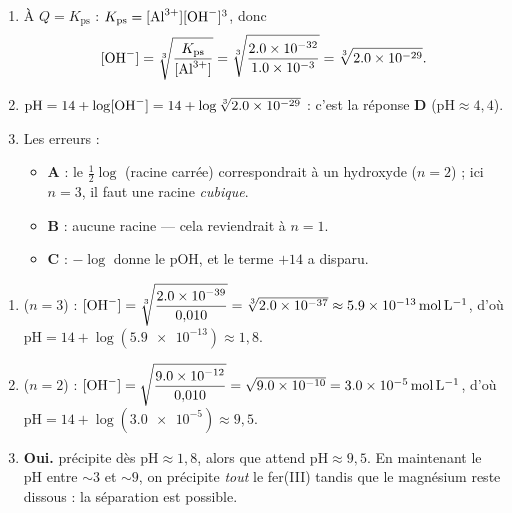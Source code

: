 \documentclass[11pt,a4paper]{article}
\begin{document}
\begin{corrige}
\begin{enumerate}[label=\alph*)]
  \item À $Q=K_{\mathrm{ps}}$ : $K_{\mathrm{ps}}=[\ce{Al^{3+}}][\ce{OH-}]^{3}$, donc
        \[ [\ce{OH-}] = \sqrt[3]{\dfrac{K_{\mathrm{ps}}}{[\ce{Al^{3+}}]}}
                     = \sqrt[3]{\dfrac{\num{2.0e-32}}{\num{1.0e-3}}} = \sqrt[3]{\num{2.0e-29}}. \]
  \item $\mathrm{pH}=14+\log[\ce{OH-}]=14+\log\sqrt[3]{\num{2.0e-29}}$ : c'est la réponse \textbf{D}
        ($\mathrm{pH}\approx 4{,}4$).
  \item Les erreurs :
    \begin{itemize}[leftmargin=1.6em,topsep=2pt,itemsep=1.5pt]
      \item \textbf{A} : le $\tfrac{1}{2}\log$ (racine carrée) correspondrait à un hydroxyde
             ($n=2$) ; ici $n=3$, il faut une racine \emph{cubique}.
      \item \textbf{B} : aucune racine — cela reviendrait à $n=1$.
      \item \textbf{C} : $-\log$ donne le pOH, et le terme $+14$ a disparu.
    \end{itemize}
\end{enumerate}
\end{corrige}

\begin{corrige}
\begin{enumerate}[label=\alph*)]
  \item {} ($n=3$) : $[\ce{OH-}]=\sqrt[3]{\dfrac{\num{2.0e-39}}{0{,}010}}=\sqrt[3]{\num{2.0e-37}}
        \approx\qty{5.9e-13}{\mole\per\litre}$, d'où $\mathrm{pH}=14+\log(\num{5.9e-13})\approx 1{,}8$.
  \item {} ($n=2$) : $[\ce{OH-}]=\sqrt{\dfrac{\num{9.0e-12}}{0{,}010}}=\sqrt{\num{9.0e-10}}
        =\qty{3.0e-5}{\mole\per\litre}$, d'où $\mathrm{pH}=14+\log(\num{3.0e-5})\approx 9{,}5$.
  \item \textbf{Oui.}  précipite dès $\mathrm{pH}\approx 1{,}8$, alors que 
        attend $\mathrm{pH}\approx 9{,}5$. En maintenant le pH entre $\sim 3$ et $\sim 9$, on précipite
        \emph{tout} le fer(III) tandis que le magnésium reste dissous : la séparation est possible.
\end{enumerate}
\end{corrige}
\end{document}
